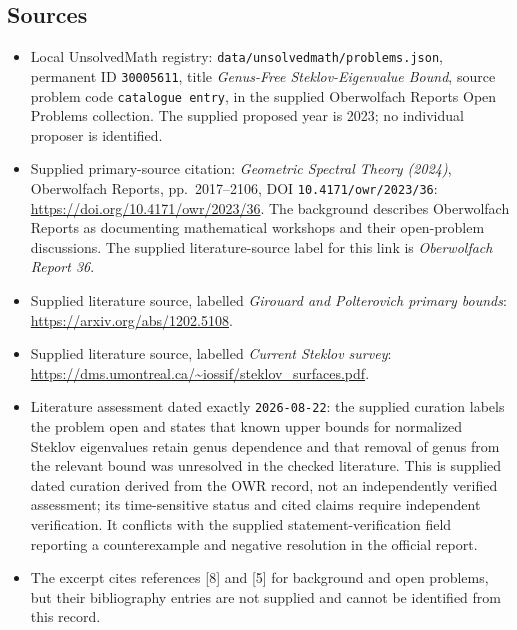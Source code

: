 \documentclass[11pt]{article}
\begin{document}
\subsection{Sources}
\begin{itemize}
\item Local UnsolvedMath registry: \texttt{data/unsolvedmath/problems.json}, permanent ID \texttt{30005611}, title \emph{Genus-Free Steklov-Eigenvalue Bound}, source problem code \texttt{catalogue entry}, in the supplied Oberwolfach Reports Open Problems collection. The supplied proposed year is 2023; no individual proposer is identified.
\item Supplied primary-source citation: \emph{Geometric Spectral Theory (2024)}, Oberwolfach Reports, pp.\ 2017--2106, DOI \texttt{10.4171/owr/2023/36}: \url{https://doi.org/10.4171/owr/2023/36}. The background describes Oberwolfach Reports as documenting mathematical workshops and their open-problem discussions. The supplied literature-source label for this link is \emph{Oberwolfach Report 36}.
\item Supplied literature source, labelled \emph{Girouard and Polterovich primary bounds}: \url{https://arxiv.org/abs/1202.5108}.
\item Supplied literature source, labelled \emph{Current Steklov survey}: \url{https://dms.umontreal.ca/~iossif/steklov_surfaces.pdf}.
\item Literature assessment dated exactly \texttt{2026-08-22}: the supplied curation labels the problem open and states that known upper bounds for normalized Steklov eigenvalues retain genus dependence and that removal of genus from the relevant bound was unresolved in the checked literature. This is supplied dated curation derived from the OWR record, not an independently verified assessment; its time-sensitive status and cited claims require independent verification. It conflicts with the supplied statement-verification field reporting a counterexample and negative resolution in the official report.
\item The excerpt cites references [8] and [5] for background and open problems, but their bibliography entries are not supplied and cannot be identified from this record.
\end{itemize}
\end{document}
